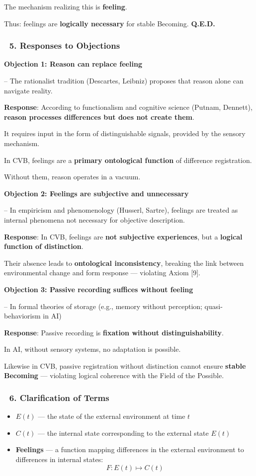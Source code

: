 \documentclass[12pt]{article}
\begin{document}
The mechanism realizing this is \textbf{feeling}.

Thus: feelings are \textbf{logically necessary} for stable Becoming. \textbf{Q.E.D.}

\subsubsection*{🔹 5. Responses to Objections}
\textbf{Objection 1: Reason can replace feeling}

– The rationalist tradition (Descartes, Leibniz) proposes that reason alone can navigate reality.

\textbf{Response}: According to functionalism and cognitive science (Putnam, Dennett), \textbf{reason processes differences but does not create them}.

It requires input in the form of distinguishable signals, provided by the sensory mechanism.

In CVB, feelings are a \textbf{primary ontological function} of difference registration.

Without them, reason operates in a vacuum.

\bigskip
\textbf{Objection 2: Feelings are subjective and unnecessary}

– In empiricism and phenomenology (Husserl, Sartre), feelings are treated as internal phenomena not necessary for objective description.

\textbf{Response}: In CVB, feelings are \textbf{not subjective experiences}, but a \textbf{logical function of distinction}.

Their absence leads to \textbf{ontological inconsistency}, breaking the link between environmental change and form response — violating Axiom [9].

\bigskip
\textbf{Objection 3: Passive recording suffices without feeling}

– In formal theories of storage (e.g., memory without perception; quasi-behaviorism in AI)

\textbf{Response}: Passive recording is \textbf{fixation without distinguishability}.

In AI, without sensory systems, no adaptation is possible.

Likewise in CVB, passive registration without distinction cannot ensure \textbf{stable Becoming} — violating logical coherence with the Field of the Possible.

\subsubsection*{🔹 6. Clarification of Terms}
\begin{itemize}
\item $E(t)$ — the state of the external environment at time $t$
\item $C(t)$ — the internal state corresponding to the external state $E(t)$
\item \textbf{Feelings} — a function mapping differences in the external environment to differences in internal states:
\[
F: E(t) \mapsto C(t)
\]
\end{itemize}
\end{document}
